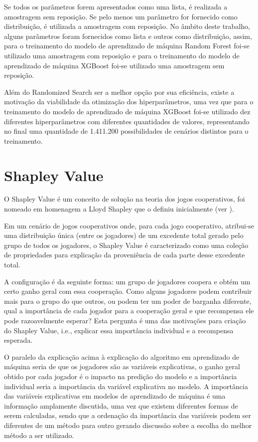 Se todos os parâmetros forem apresentados como uma lista, é realizada a amostragem sem reposição. Se pelo menos um parâmetro for fornecido como distribuição, é utilizada a amostragem com reposição. No âmbito deste trabalho, alguns parâmetros foram fornecidos como lista e outros como distribuição, assim, para o treinamento do modelo de aprendizado de máquina Random Forest foi-se utilizado uma amostragem com reposição e para o treinamento do modelo de aprendizado de máquina XGBoost foi-se utilizado uma amostragem sem reposição.

Além do Randomized Search ser a melhor opção por sua eficiência, existe a motivação da viabilidade da otimização dos hiperparâmetros, uma vez que para o treinamento do modelo de aprendizado de máquina XGBoost foi-se utilizado dez diferentes hiperparâmetros com diferentes quantidades de valores, representando no final uma quantidade de 1.411.200 possibilidades de cenários distintos para o treinamento.

\section{Shapley Value}
\label{sec:shapley_value}

O Shapley Value é um conceito de solução na teoria dos jogos cooperativos, foi nomeado em homenagem a Lloyd Shapley que o definiu inicialmente (ver \citet{Shapley1953}).

Em um cenário de jogos cooperativos onde, para cada jogo cooperativo, atribui-se uma distribuição única (entre os jogadores) de um excedente total gerado pelo grupo de todos os jogadores, o Shapley Value é caracterizado como uma coleção de propriedades para explicação da proveniência de cada parte desse excedente total.

A configuração é da seguinte forma: um grupo de jogadores coopera e obtém um certo ganho geral com essa cooperação. Como alguns jogadores podem contribuir mais para o grupo do que outros, ou podem ter um poder de barganha diferente, qual a importância de cada jogador para a cooperação geral e que recompensa ele pode razoavelmente esperar? Esta pergunta é uma das motivações para criação do Shapley Value, i.e., explicar essa importância individual e a recompensa esperada.

O paralelo da explicação acima à explicação do algoritmo em aprendizado de máquina seria de que os jogadores são as variáveis explicativas, o ganho geral obtido por cada jogador é o impacto na predição do modelo e a importância individual seria a importância da variável explicativa no modelo. A importância das variáveis explicativas em modelos de aprendizado de máquina é uma informação amplamente discutida, uma vez que existem diferentes formas de serem calculadas, sendo que a ordenação da importância das variáveis podem ser diferentes de um método para outro gerando discussão sobre a escolha do melhor método a ser utilizado.

